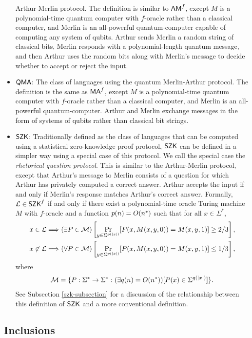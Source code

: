 \begin{itemize}
  Arthur-Merlin protocol. The definition is similar to $\mathsf{AM}^f$, except $M$ is 
  a polynomial-time quantum computer with $f$-oracle rather than a classical 
  computer, and Merlin is an all-powerful quantum-computer capable of computing any
  system of qubits. Arthur sends Merlin a random string of classical bits, Merlin 
  responds with a polynomial-length quantum message, and then Arthur uses the 
  random bits along with Merlin's message to decide whether to accept or reject the
  input.
\item $\mathsf{QMA}$: The class of languages using the quantum Merlin-Arthur
  protocol. The definition is the same as $\mathsf{MA}^f$, except $M$ is a
  polynomial-time quantum computer with $f$-oracle rather than a classical
  computer, and Merlin is an all-powerful quantum-computer. Arthur and Merlin 
  exchange messages in the form of systems of qubits rather than classical bit 
  strings.
\item $\mathsf{SZK}$: Traditionally defined as the class of languages that can be 
  computed using a statistical zero-knowledge proof protocol, $\mathsf{SZK}$ can be 
  defined in a simpler way using a special case of this protocol. We call the 
  special case the \textit{rhetorical question protocol}. This is 
  similar to the Arthur-Merlin protocol, except that Arthur's message to Merlin 
  consists of a question for which Arthur has privately computed a correct answer. 
  Arthur accepts the input if and only if Merlin's 
  response matches Arthur's correct answer. Formally, $\mathcal{L}\in\mathsf{SZK}^f$ if and 
  only if there exist a polynomial-time oracle Turing machine $M$ with $f$-oracle 
  and a function $p(n)=O(n^*)$ such that for all $x\in\Sigma^*$,
  \begin{align*}
  x\in\mathcal{L}&\Longrightarrow(\exists P\in\mathcal{M})
  \left[\Pr_{y\in\Sigma^{p(|x|)}}[P(x,M(x,y,0))=M(x,y,1)]\geq 2/3\right], \\
  x\not\in\mathcal{L}&\Longrightarrow(\forall P\in\mathcal{M})
  \left[\Pr_{y\in\Sigma^{p(|x|)}}[P(x,M(x,y,0))=M(x,y,1)]\leq 1/3\right],
  \end{align*}
  where
  \[
  \mathcal{M}=
  \{P:\Sigma^*\rightarrow\Sigma^*:(\exists q(n)=O(n^*))[P(x)\in\Sigma^{q(|x|)}]\}.
  \]
  See Subsection \ref{szk-subsection} for a discussion of the relationship between 
  this definition of $\mathsf{SZK}$ and a more conventional definition.
\end{itemize}

\subsection{Inclusions}

